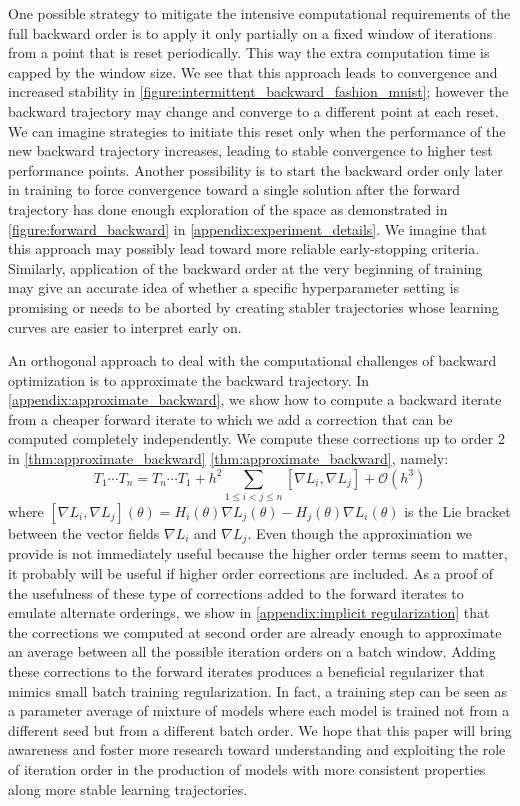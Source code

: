 \documentclass[10pt]{article} %
\theoremstyle{plain}
\theoremstyle{definition}
\theoremstyle{remark}
\begin{document}
One possible strategy to mitigate the intensive computational requirements of the full backward order is to apply it only partially on a fixed window of iterations from a point that is reset periodically. This way the extra computation time is capped by the window size. We see that this approach leads to convergence and increased stability in \cref{figure:intermittent_backward_fashion_mnist}; however the backward trajectory may change and converge to a different point at each reset. We can imagine strategies to initiate this reset only when the performance of the new backward trajectory increases, leading to stable convergence to higher test performance points. Another possibility is to start the backward order only later in training to force convergence toward a single solution after the forward trajectory has done enough exploration of the space as demonstrated in \cref{figure:forward_backward} in \cref{appendix:experiment_details}. We imagine that this approach may possibly lead toward more reliable early-stopping criteria. Similarly, application of the backward order at the very beginning of training may give an accurate idea of whether a specific hyperparameter setting is promising or needs to be aborted by creating stabler trajectories whose learning curves are easier to interpret early on.

An orthogonal approach to deal with the computational challenges of backward optimization is to approximate the backward trajectory. In \cref{appendix:approximate_backward}, we show how to compute a backward iterate from a cheaper forward iterate to which we add a correction that can be computed completely independently. We compute these corrections up to order 2 in \cref{thm:approximate_backward} \cref{thm:approximate_backward}, namely:
\begin{equation*}
    T_1 \cdots T_n = T_n \cdots T_1 + h^2 \sum_{1\leq i<j\leq n} [\nabla L_i, \nabla L_j] + \mathcal O(h^3)
\end{equation*}
where $[\nabla L_i, \nabla L_j](\theta) = H_i(\theta)\nabla L_j(\theta) - H_j(\theta)\nabla L_i(\theta)$ is the Lie bracket between the vector fields $\nabla L_i$ and $\nabla L_j$.
Even though the approximation we provide is not immediately useful because the higher order terms seem to matter, it probably will be useful if higher order corrections are included. As a proof of the usefulness of these type of corrections added to the forward iterates to emulate alternate orderings, we show in \cref{appendix:implicit regularization} that the corrections we computed at second order are already enough to approximate an average between all the possible iteration orders on a batch window. Adding these corrections to the forward iterates produces a beneficial regularizer that mimics small batch training regularization. In fact, a training step can be seen as a parameter average of mixture of models where each model is trained not from a different seed but from a different batch order. We hope that this paper will bring awareness and foster more research toward understanding and exploiting the role of iteration order in the production of models with more consistent properties along more stable learning trajectories. 
\end{document}
